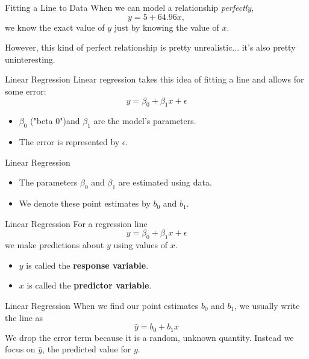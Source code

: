 \begin{frame}{Fitting a Line to Data}
    When we can model a relationship \textit{perfectly},
    \[
        y = 5 + 64.96x,
    \]
    we know the exact value of $y$ just by knowing the value of $x$.
    
    \vspace{12pt}However, this kind of perfect relationship is pretty unrealistic... it's also pretty uninteresting.
\end{frame}

\begin{frame}{Linear Regression}
    Linear regression takes this idea of fitting a line and allows for some error:
    \[
        y = \beta_0 + \beta_1 x + \epsilon
    \]
    \begin{itemize}
        \item $\beta_0$ ("beta 0")and $\beta_1$ are the model's parameters.
        \item The error is represented by $\epsilon$.
    \end{itemize}
\end{frame}

\begin{frame}{Linear Regression}
    \begin{itemize}
        \item The parameters $\beta_0$ and $\beta_1$ are estimated using data.
        \item We denote these point estimates by $b_0$ and $b_1$.
    \end{itemize}
\end{frame}

\begin{frame}{Linear Regression}
    For a regression line
    \[
        y = \beta_0 + \beta_1 x + \epsilon
    \]
    we make predictions about $y$ using values of $x$.
    \begin{itemize}
        \item $y$ is called the \textbf{response variable}.
        \item $x$ is called the \textbf{predictor variable}. 
    \end{itemize}
\end{frame}

\begin{frame}{Linear Regression}
    When we find our point estimates $b_0$ and $b_1$, we usually write the line as
    \[
        \hat{y} = b_0 + b_1 x
    \]
    We drop the error term because it is a random, unknown quantity. Instead we focus on $\hat{y}$, the predicted value for $y$. 
\end{frame}

